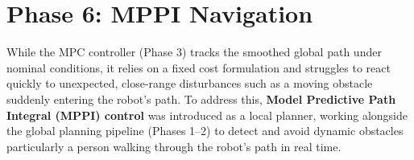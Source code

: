 %

\section{Phase 6: MPPI Navigation}
\label{sec:phase7_mppi}

While the MPC controller (Phase 3) tracks the smoothed global path under nominal conditions, it relies on a fixed cost formulation and struggles to react quickly to unexpected, close-range disturbances such as a moving obstacle suddenly entering the robot's path. To address this, \textbf{Model Predictive Path Integral (MPPI) control} was introduced as a local planner, working alongside the global planning pipeline (Phases 1--2) to detect and avoid dynamic obstacles particularly a person walking through the robot's path in real time.

